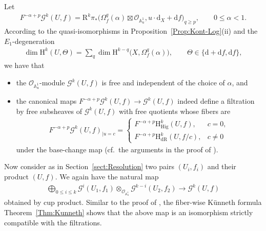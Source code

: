 \documentclass[pdftex]{sigma}
\renewcommand{\AA}{\mathbb{A}}
\newcommand{\sG}{\mathscr{G}}
\newcommand{\sO}{\mathscr{O}}
\newcommand{\de}{\mathrm{d}}
\newcommand{\dR}{\mathrm{dR}}
\newcommand{\Hig}{\mathrm{Hig}}
\newcommand{\coH}{\mathrm{H}}
\newcommand{\ddRH}{\Theta}
\newcommand{\RD}{\mathrm{R}}
\newcommand{\rest}[1]{_{|{#1}}}
\begin{document}
Let
\begin{gather*} F^{-\alpha+p}\sG^k(U,f) = \RD^k\pi_* \big(\Omega_f^q(\alpha)\boxtimes\sO_{\AA^1_u}, u\cdot\de_X +\de f \big)_{q\geq p}, \qquad 0\leq \alpha <1. \end{gather*}
According to the quasi-isomorphisms in Proposition~\ref{Prop:Kont-Log}(ii) and the $E_1$-degeneration
\begin{gather*} \dim \coH^k(U,\ddRH) = 	\sum_q \dim \coH^{k-q}\big(X,\Omega_f^q(\alpha)\big), \qquad \ddRH \in \{\de +\de f, \de f \}, \end{gather*}
we have that
\begin{itemize}\itemsep=0pt
\item the $\sO_{\AA^1_u}$-module $\sG^k(U,f)$ is free and independent of the choice of $\alpha$, and
\item the canonical maps $F^{-\alpha+p}\sG^k(U,f) \to \sG^k(U,f)$ indeed define a filtration by free subsheaves of $\sG^k(U,f)$ with free quotients whose fibers are
\begin{gather}\label{eq:Kont-fiber}
F^{-\alpha+p}\sG^k(U,f)\rest{u=c} = \begin{cases}
F^{-\alpha+p}\coH_\Hig^k(U,f), & c=0, \\
F^{-\alpha+p}\coH_\dR^k(U,f/c), & c\neq 0
\end{cases}
\end{gather}
under the base-change map (cf.\ the arguments in the proof of \cite[Proposition~1.5.1]{ESY}).
\end{itemize}

Now consider as in Section~\ref{sect:Resolution} two pairs $(U_i, f_i)$ and their product $(U,f)$. We again have the natural map
\begin{gather*} \bigoplus_{0\leq i\leq k} \sG^i(U_1,f_1) \otimes_{\sO_{\AA^1_u}} \sG^{k-i}(U_2,f_2) \to \sG^k(U,f) \end{gather*}
obtained by cup product. Similar to the proof of \cite[Proposition~1.5.1]{ESY}, the fiber-wise K\"unneth formula Theorem~\ref{Thm:Kunneth} shows that the above map is an isomorphism strictly compatible with the filtrations.
\end{document}
